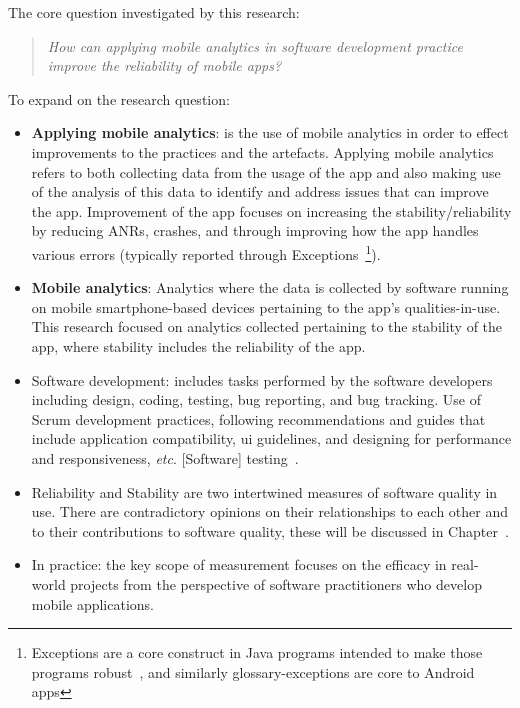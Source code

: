 The core question investigated by this research:

\begin{quote}
  \emph{How can applying mobile analytics in software development practice improve the reliability of mobile apps?}~\label{overall-research-question}
\end{quote}

To expand on the research question:
\begin{itemize}
    \item \textbf{Applying mobile analytics}: is the use of mobile analytics in order to effect improvements to the practices and the artefacts. Applying mobile analytics refers to both collecting data from the usage of the app and also making use of the analysis of this data to identify and address issues that can improve the app. Improvement of the app focuses on increasing the stability/reliability by reducing ANRs, crashes, and through improving how the app handles various errors (typically reported through Exceptions~\footnote{Exceptions are a core construct in Java programs intended to make those programs robust~\cite{robillard2000_designing_robust_java_programs_with_exceptions}, and similarly \glspl{glossary-exception} are core to Android apps}).
    \item \textbf{Mobile analytics}: Analytics where the data is collected by software running on mobile smartphone-based devices pertaining to the app's qualities-in-use. This research focused on analytics collected pertaining to the stability of the app, where stability includes the reliability of the app.
    \item Software development: includes tasks performed by the software developers including design, coding, testing, bug reporting, and bug tracking.  Use of Scrum development practices, following recommendations and guides that include application compatibility, \gls{ui} guidelines, and designing for performance and responsiveness, \emph{etc}. [Software] testing~.~
    \item Reliability and Stability are two intertwined measures of software quality in use. There are contradictory opinions on their relationships to each other and to their contributions to software quality, these will be discussed in Chapter~. 
    \item In practice: the key scope of measurement focuses on the efficacy in real-world projects from the perspective of software practitioners who develop mobile applications.
\end{itemize}

